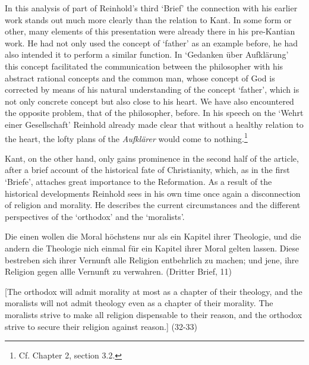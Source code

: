  In this analysis of part of Reinhold's third `Brief' the connection with his earlier work stands out much more clearly than the relation to Kant. In some form or other, many elements of this presentation were already there in his pre{-}Kantian work. He had not only used the concept of `father' as an example before, he had also intended it to perform a similar function. In `Gedanken \"{u}ber Aufkl\"{a}rung' this concept facilitated the communication between the philosopher with his abstract rational concepts and the common man, whose concept of God is corrected by means of his natural understanding of the concept `father', which is not only concrete concept but also close to his heart. We have also encountered the opposite problem, that of the philosopher, before. In his speech on the `Wehrt einer Gesellschaft' Reinhold already made clear that without a healthy relation to the heart, the lofty plans of the \textit{Aufkl\"{a}rer} would come to nothing.\footnote{ Cf. Chapter 2, section 3.2. } 

 Kant, on the other hand, only gains prominence in the second half of the article, after a brief account of the historical fate of Christianity, which, as in the first `Briefe', attaches great importance to the Reformation. As a result of the historical developments Reinhold sees in his own time once again a disconnection of religion and morality. He describes the current circumstances and the different perspectives of the `orthodox' and the `moralists'. 

Die einen wollen die Moral h\"{o}chstens nur als ein Kapitel ihrer Theologie, und die andern die Theologie nich einmal f\"{u}r ein Kapitel ihrer Moral gelten lassen. Diese bestreben sich ihrer Vernunft alle Religion entbehrlich zu machen; und jene, ihre Religion gegen allle Vernunft zu verwahren. (Dritter Brief, 11)

[The orthodox will admit morality at most as a chapter of their theology, and the moralists will not admit theology even as a chapter of their morality. The moralists strive to make all religion dispensable to their reason, and the orthodox strive to secure their religion against reason.] (32{-}33) 


